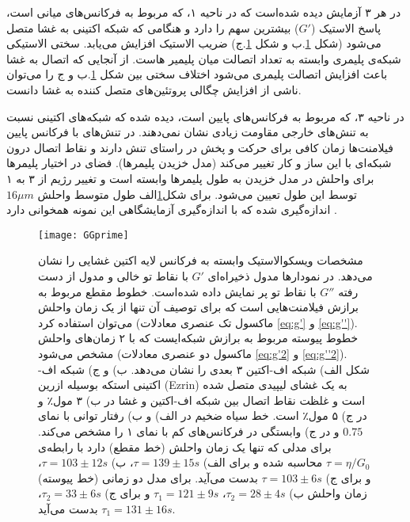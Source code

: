 در هر ۳ آزمایش دیده‌ شده‌است که در ناحیه ۱، که مربوط به فرکانس‌های میانی است، پاسخ الاستیک ($G'$) بیشترین سهم را دارد و هنگامی‌ که شبکه اکتینی به غشا متصل می‌شود (شکل \ref{fig:gg}.ب و شکل \ref{fig:gg}.ج) ضریب الاستیک افزایش می‌یابد. سختی الاستیکی شبکه‌ی پلیمری وابسته به تعداد اتصالت میان پلیمیر هاست. از آنجایی که اتصال به غشا باعث افزایش اتصالت پلیمری می‌شود اختلاف سختی بین شکل \ref{fig:gg}.ب و ج را می‌توان ناشی از افزایش چگالی پروتئین‌های متصل کننده به غشا دانست\cite{doi:10.1021/acs.jpcb.7b11491}.

در ناحیه ۳، که مربوط به فرکانس‌های پایین است، دیده‌ شده که شبکه‌های اکتینی نسبت به تنش‌های خارجی مقاومت زیادی نشان نمی‌دهند. در تنش‌های با فرکانس پایین فیلامنت‌ها زمان کافی برای حرکت و پخش در راستای تنش دارند و نقاط اتصال درون شبکه‌ای با این ساز و کار تغییر می‌کند (مدل خزیدن پلیمر‌ها). فضای در اختیار پلیمر‌ها برای واحلش در مدل خزیدن به طول پلیمر‌ها وابسته است و  تغییر رژیم از ۳ به  ۱ توسط این طول تعیین می‌شود. برای شکل\ref{fig:gg}الف طول متوسط واحلش $16\mu m$ اندازه‌گیری شده که با اندازه‌گیری آزمایشگاهی این نمونه همخوانی دارد \cite{doi:10.1021/acs.jpcb.7b11491}.



\begin{figure}[htbp]
\begin{center}
\texttt{[image: GGprime]}
\caption{
مشخصات ویسکوالاستیک وابسته به فرکانس لایه اکتین غشایی را نشان می‌دهد. در نمودارها مدول ذخیرا‌ه‌ای $G'$ با نقاط تو خالی و مدول از دست رفته $G''$ با نقاط تو پر نمایش داده شده‌است. خطوط مقطع  مربوط به برازش فیلامنت‌هایی است که برای توصیف آن تنها از یک زمان واحلش می‌توان استفاده کرد (ماکسول تک عنصری معادلات \ref{eq:g'} و \ref{eq:g''}). خطوط پیوسته مربوط به برازش شبکه‌ایست که با ۲ زمان‌های واحلش مشخص می‌شود (ماکسول دو عنصری معادلات \ref{eq:g'2} و \ref{eq:g''2}). شکل الف) شبکه اف-اکتین ۳ بعدی را نشان می‌دهد. ب) و ج) شبکه اف-اکتینی استکه بوسیله ازرین (Ezrin) به یک غشای لیپیدی متصل شده است و غلظت نقاط اتصال بین شبکه اف-اکتین و غشا در ب) ۳ مول٪ و در ج) ۵ مول٪ است.  خط سیاه ضخیم در الف) و ب) رفتار توانی با نمای $0.75$  و در ج) وابستگی در فرکانس‌های کم با نمای ۱ را مشخص می‌کند. برای مدلی که تنها یک  زمان واحلش (خط مقطع) دارد با رابطه‌ی $\tau=\eta/G_0$ محاسبه شده و برای الف) $\tau=139\pm15 s$، ب) $\tau=103\pm12 s$، و برای ج) $\tau=103\pm6 s$ بدست می‌آید. برای مدل دو زمانی (خط پیوسته) زمان واحلش ب) $\tau_2=28\pm4 s$، $\tau_1=121\pm9 s$ و برای ج) $\tau_2=33\pm6 s$، $\tau_1=131\pm16 s$ بدست می‌آید\cite{doi:10.1021/acs.jpcb.7b11491}.
}
\label{fig:gg}
\end{center}
\end{figure}


